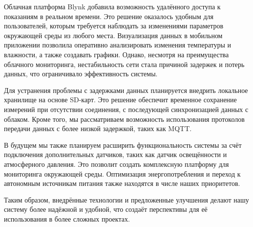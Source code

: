 \documentclass[a4paper,12pt]{article}
\begin{document}
Облачная платформа Blynk добавила возможность удалённого доступа к показаниям в реальном времени. Это решение оказалось удобным для пользователей, которым требуется наблюдать за изменениями параметров окружающей среды из любого места. Визуализация данных в мобильном приложении позволила оперативно анализировать изменения температуры и влажности, а также создавать графики. Однако, несмотря на преимущества облачного мониторинга, нестабильность сети стала причиной задержек и потерь данных, что ограничивало эффективность системы.

Для устранения проблемы с задержками данных планируется внедрить локальное хранилище на основе SD-карт. Это решение обеспечит временное сохранение измерений при отсутствии соединения, с последующей синхронизацией данных с облаком. Кроме того, мы рассматриваем возможность использования протоколов передачи данных с более низкой задержкой, таких как MQTT.

В будущем мы также планируем расширить функциональность системы за счёт подключения дополнительных датчиков, таких как датчик освещённости и атмосферного давления. Это позволит создать комплексную платформу для мониторинга окружающей среды. Оптимизация энергопотребления и переход к автономным источникам питания также находятся в числе наших приоритетов.

Таким образом, внедрённые технологии и предложенные улучшения делают нашу систему более надёжной и удобной, что создаёт перспективы для её использования в более сложных проектах.
\end{document}
